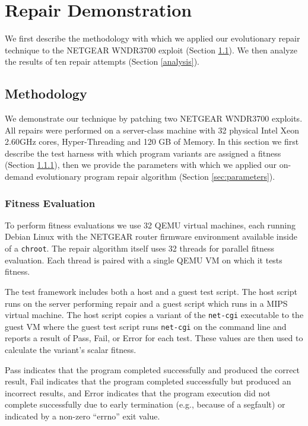 \documentclass{sigcomm-alternate}
\begin{document}
\section{Repair Demonstration}
\label{repair-demonstration}

We first describe the methodology with which we applied our
evolutionary repair technique to the NETGEAR WNDR3700 exploit (Section
\ref{methodology}).  We then analyze the results of ten repair
attempts (Section \ref{analysis}).

\subsection{Methodology}
\label{methodology}
We demonstrate our technique by patching two NETGEAR WNDR3700
exploits.  All repairs were performed on a server-class machine with
32 physical Intel Xeon 2.60GHz cores, Hyper-Threading and 120 GB of
Memory.  In this section we first describe the test harness with which
program variants are assigned a fitness (Section
\ref{fitness-evaluation}), then we provide the parameters with which
we applied our on-demand evolutionary program repair algorithm
(Section \ref{sec:parameters}).

\subsubsection{Fitness Evaluation}
\label{fitness-evaluation}
To perform fitness evaluations we use 32 QEMU virtual machines, each
running Debian Linux with the NETGEAR router firmware environment
available inside of a \texttt{chroot}.  The repair algorithm itself
uses 32 threads for parallel fitness evaluation.  Each thread is
paired with a single QEMU VM on which it tests fitness.

The test framework includes both a host and a guest test script.  The
host script runs on the server performing repair and a guest script
which runs in a MIPS virtual machine.  The host script copies a
variant of the \texttt{net-cgi} executable to the guest VM where the
guest test script runs \texttt{net-cgi} on the command line and
reports a result of {\sc Pass}, {\sc Fail}, or {\sc Error} for each
test.  These values are then used to calculate the variant's scalar
fitness.

{\sc Pass} indicates that the program completed successfully and
produced the correct result, {\sc Fail} indicates that the program
completed successfully but produced an incorrect results, and {\sc
  Error} indicates that the program execution did not complete
successfully due to early termination (e.g., because of a segfault) or
indicated by a non-zero ``errno'' exit value.
\end{document}
